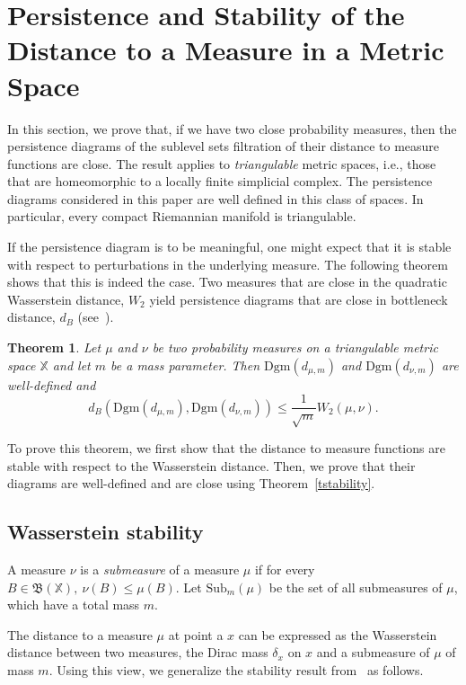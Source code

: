 \documentclass[a4paper]{article}
\newcommand\dm{d_{\mu,m}}
\newcommand\X{\mathbb{X}}
\newcommand\Dgm[1]{\mathrm{Dgm}(#1)}
\newcommand\Sub[2]{\mathrm{Sub}_#1(#2)}
\newtheorem{theorem}{Theorem}[section]
\begin{document}
\section{Persistence and Stability of the Distance to a Measure in a Metric Space} \label{sPersStabDtm}

In this section, we prove that, if we have two close probability measures, then the persistence diagrams of the sublevel sets filtration of their distance to measure functions are close.
The result applies to \emph{triangulable} metric spaces, i.e., those that are homeomorphic to a locally finite simplicial complex.
The persistence diagrams considered in this paper are well defined in this class of spaces.
In particular, every compact Riemannian manifold is triangulable.

  If the persistence diagram is to be meaningful, one might expect that it is stable with respect to perturbations in the underlying measure.
  The following theorem shows that this is indeed the case.
  Two measures that are close in the quadratic Wasserstein distance, $W_2$ yield persistence diagrams that are close in bottleneck distance, $d_B$ (see~\cite[Sec. 7.1]{villani2003tot}).

\begin{theorem}\label{tStabPersDtm}
Let $\mu$ and $\nu$ be two probability measures on a triangulable metric space $\X$ and let $m$ be a mass parameter. 
Then $\Dgm{\dm}$ and $\Dgm{d_{\nu,m}}$ are well-defined and
$$d_B(\Dgm{\dm},\Dgm{d_{\nu,m}})\leq\frac{1}{\sqrt{m}}W_2(\mu,\nu).$$
\end{theorem}

To prove this theorem, we first show that the distance to measure functions are stable with respect to the Wasserstein distance.
Then, we prove that their diagrams are well-defined and are close using Theorem~\ref{tstability}.

\subsection{Wasserstein stability}

A measure $\nu$ is a \emph{submeasure} of a measure $\mu$ if for every $B\in\mathfrak{B}(\X),\ \nu(B)\leq\mu(B)$.
Let $\Sub{m}{\mu}$ be the set of all submeasures of $\mu$, which have a total mass $m$.

The distance to a measure $\mu$ at point a $x$ can be expressed as the Wasserstein distance between two measures,
the Dirac mass $\delta_x$ on $x$
and a submeasure of $\mu$ of mass $m$.
Using this view, we generalize the stability result from~\cite{gipmCCM} as follows. 
\end{document}
